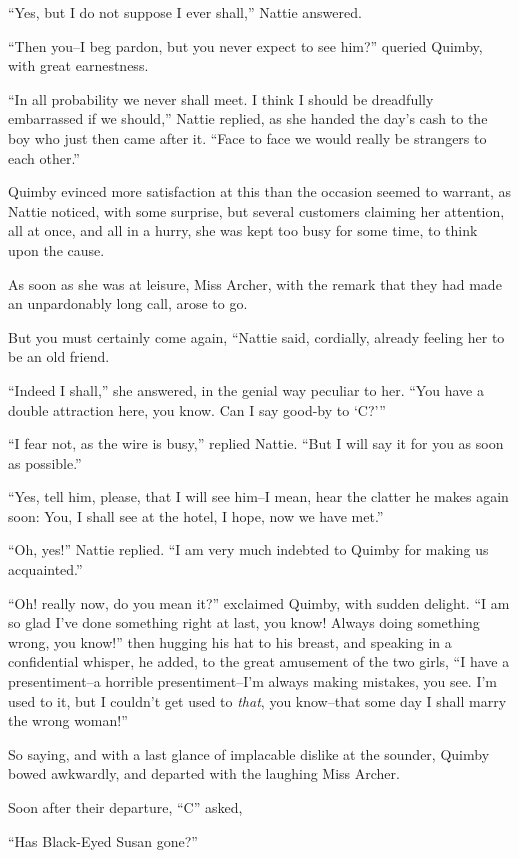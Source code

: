 ``Yes, but I do not suppose I ever shall,'' Nattie answered.

``Then you--I beg pardon, but you never expect to see him?'' queried
Quimby, with great earnestness.

``In all probability we never shall meet. I think I should be dreadfully
embarrassed if we should,'' Nattie replied, as she handed the day's cash
to the boy who just then came after it. ``Face to face we would really be
strangers to each other.''

Quimby evinced more satisfaction at this than the occasion seemed to
warrant, as Nattie noticed, with some surprise, but several customers
claiming her attention, all at once, and all in a hurry, she was kept
too busy for some time, to think upon the cause.

As soon as she was at leisure, Miss Archer, with the remark that they
had made an unpardonably long call, arose to go.

But you must certainly come again, ``Nattie said, cordially, already
feeling her to be an old friend.

``Indeed I shall,'' she answered, in the genial way peculiar to her. ``You
have a double attraction here, you know. Can I say good-by to `C?'{}''

``I fear not, as the wire is busy,'' replied Nattie. ``But I will say it
for you as soon as possible.''

``Yes, tell him, please, that I will see him--I mean, hear the clatter he
makes again soon: You, I shall see at the hotel, I hope, now we have
met.''

``Oh, yes!'' Nattie replied. ``I am very much indebted to Quimby for making
us acquainted.''

``Oh! really now, do you mean it?'' exclaimed Quimby, with sudden delight.
``I am so glad I've done something right at last, you know! Always doing
something wrong, you know!'' then hugging his hat to his breast, and
speaking in a confidential whisper, he added, to the great amusement of
the two girls, ``I have a presentiment--a horrible presentiment--I'm
always making mistakes, you see. I'm used to it, but I couldn't get used
to \emph{that}, you know--that some day I shall marry the wrong woman!''

So saying, and with a last glance of implacable dislike at the sounder,
Quimby bowed awkwardly, and departed with the laughing Miss Archer.

Soon after their departure, ``C'' asked,

``Has Black-Eyed Susan gone?''

